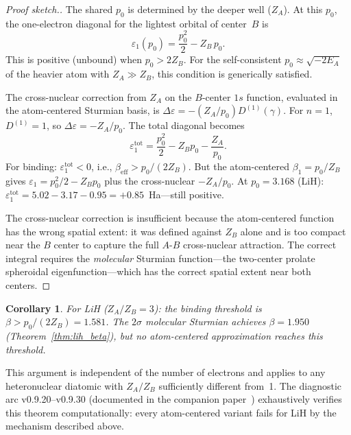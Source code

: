 \documentclass[aps,pra,twocolumn,superscriptaddress,longbibliography]{revtex4-2}
\newtheorem{corollary}{Corollary}
\begin{document}
\begin{proof}[Proof sketch.]
The shared $p_0$ is determined by the deeper well ($Z_A$).  At this
$p_0$, the one-electron diagonal for the lightest orbital of center~$B$
is
\begin{equation}
\varepsilon_1(p_0) = \frac{p_0^2}{2} - Z_B\, p_0.
\label{eq:h1s_diag}
\end{equation}
This is positive (unbound) when $p_0 > 2Z_B$.  For the self-consistent
$p_0 \approx \sqrt{-2E_A}$ of the heavier atom with $Z_A \gg Z_B$,
this condition is generically satisfied.

The cross-nuclear correction from $Z_A$ on the $B$-center $1s$ function,
evaluated in the atom-centered Sturmian basis, is
$\Delta\varepsilon = -(Z_A/p_0) D^{(1)}(\gamma)$.  For $n = 1$,
$D^{(1)} = 1$, so $\Delta\varepsilon = -Z_A/p_0$.  The total diagonal
becomes
\begin{equation}
\varepsilon_1^{\text{tot}} = \frac{p_0^2}{2} - Z_B p_0 - \frac{Z_A}{p_0}.
\label{eq:h1s_total}
\end{equation}
For binding: $\varepsilon_1^{\text{tot}} < 0$, i.e.,
$\beta_{\text{eff}} > p_0/(2Z_B)$.  But the atom-centered $\beta_1 = p_0/Z_B$
gives $\varepsilon_1 = p_0^2/2 - Z_B p_0$ plus the cross-nuclear
$-Z_A/p_0$.  At $p_0 = 3.168$ (LiH): $\varepsilon_1^{\text{tot}} =
5.02 - 3.17 - 0.95 = +0.85$~Ha---still positive.

The cross-nuclear correction is insufficient because the atom-centered
function has the wrong spatial extent: it was defined against $Z_B$
alone and is too compact near the $B$ center to capture the full
$A$-$B$ cross-nuclear attraction.  The correct integral requires the
\emph{molecular} Sturmian function---the two-center prolate spheroidal
eigenfunction---which has the correct spatial extent near both centers.
\end{proof}

\begin{corollary}
For LiH ($Z_A/Z_B = 3$): the binding threshold is
$\beta > p_0/(2Z_B) = 1.581$.  The $2\sigma$ molecular Sturmian
achieves $\beta = 1.950$ (Theorem~\ref{thm:lih_beta}), but no
atom-centered approximation reaches this threshold.
\end{corollary}

This argument is independent of the number of electrons and applies to
any heteronuclear diatomic with $Z_A/Z_B$ sufficiently different from~1.
The diagnostic arc v0.9.20--v0.9.30 (documented in the companion
paper~\cite{loutey_fci}) exhaustively verifies this theorem
computationally: every atom-centered variant fails for LiH by the
mechanism described above.
\end{document}
